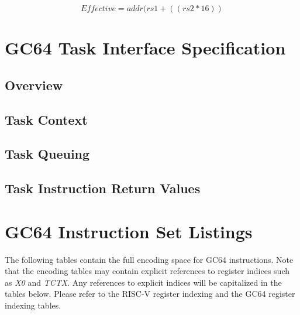 \documentclass{article}
\begin{document}
\begin{equation}
Effective = addr(rs1 + ((rs2 * 16))
\end{equation}


\section{GC64 Task Interface Specification}

\subsection{Overview}

\subsection{Task Context}

\subsection{Task Queuing}

\subsection{Task Instruction Return Values}

\section{GC64 Instruction Set Listings}

The following tables contain the full encoding space for GC64 instructions. 
Note that the encoding tables may contain explicit references to register
indices such as \emph{X0} and \emph{TCTX}.  Any references to explicit indices
will be capitalized in the tables below.  Please refer to the RISC-V register
indexing and the GC64 register indexing tables.
\end{document}
